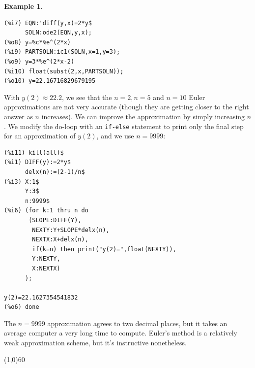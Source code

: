 \documentclass[10.5pt,twoside]{report}
\theoremstyle{definition}
\newtheorem{exmp}{Example}[section]
\begin{document}
\begin{exmp}
\begin{verbatim}
(%i7) EQN:'diff(y,x)=2*y$
      SOLN:ode2(EQN,y,x);
(%o8) y=%c*%e^(2*x)
(%i9) PARTSOLN:ic1(SOLN,x=1,y=3);
(%o9) y=3*%e^(2*x-2)
(%i10) float(subst(2,x,PARTSOLN));
(%o10) y=22.16716829679195
\end{verbatim}

With $y(2)\approx 22.2$, we see that the $n=2,n=5$ and $n=10$ Euler approximations are not very accurate (though they are getting closer to the right answer as $n$ increases).  We can improve the approximation by simply increasing $n$.  We modify the do-loop with an \verb|if-else| statement to print only the final step for an approximation of $y(2)$, and we use $n=9999$:

\begin{verbatim}
(%i11) kill(all)$
(%i1) DIFF(y):=2*y$
      delx(n):=(2-1)/n$
(%i3) X:1$
      Y:3$
      n:9999$
(%i6) (for k:1 thru n do
       (SLOPE:DIFF(Y),
        NEXTY:Y+SLOPE*delx(n),
        NEXTX:X+delx(n),
        if(k=n) then print("y(2)=",float(NEXTY)),
        Y:NEXTY,
        X:NEXTX)
      );
      
y(2)=22.1627354541832
(%o6) done
\end{verbatim}

The $n=9999$ approximation agrees to two decimal places, but it takes an average computer a very long time to compute.  Euler's method is a relatively weak approximation scheme, but it's instructive nonetheless.

\end{exmp}

\line(1,0){60}
\linethickness{0.5mm}
\end{document}
